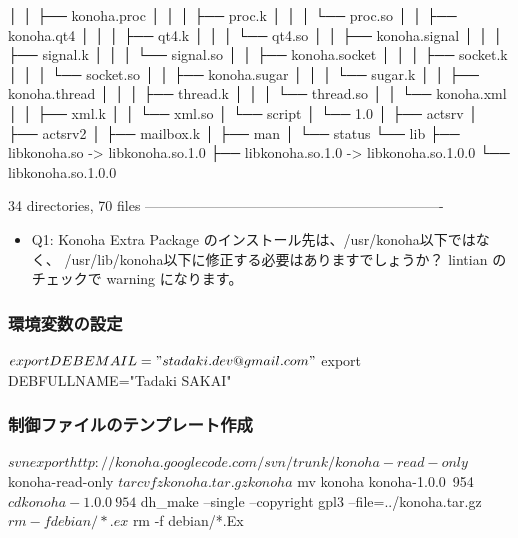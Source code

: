 \documentclass[mingoth,a4paper]{jsarticle}
\begin{document}
\begin{commandline}
    │   │       ├── konoha.proc
    │   │       │   ├── proc.k
    │   │       │   └── proc.so
    │   │       ├── konoha.qt4
    │   │       │   ├── qt4.k
    │   │       │   └── qt4.so
    │   │       ├── konoha.signal
    │   │       │   ├── signal.k
    │   │       │   └── signal.so
    │   │       ├── konoha.socket
    │   │       │   ├── socket.k
    │   │       │   └── socket.so
    │   │       ├── konoha.sugar
    │   │       │   └── sugar.k
    │   │       ├── konoha.thread
    │   │       │   ├── thread.k
    │   │       │   └── thread.so
    │   │       └── konoha.xml
    │   │           ├── xml.k
    │   │           └── xml.so
    │   └── script
    │       └── 1.0
    │           ├── actsrv
    │           ├── actsrv2
    │           ├── mailbox.k
    │           ├── man
    │           └── status
    └── lib
        ├── libkonoha.so -> libkonoha.so.1.0
        ├── libkonoha.so.1.0 -> libkonoha.so.1.0.0
        └── libkonoha.so.1.0.0

34 directories, 70 files
----------------------------------------------------------------
\end{commandline}
\fi

\begin{itemize}
\item Q1: Konoha Extra Package のインストール先は、/usr/konoha以下ではなく、
/usr/lib/konoha以下に修正する必要はありますでしょうか？
lintian のチェックで warning になります。
\end{itemize}

\subsubsection{環境変数の設定}
\begin{commandline}
$ export DEBEMAIL="stadaki.dev@gmail.com"
$ export DEBFULLNAME="Tadaki SAKAI"
\end{commandline}

\subsubsection{制御ファイルのテンプレート作成}
\begin{commandline}
$ svn export http://konoha.googlecode.com/svn/trunk/ konoha-read-only
$ konoha-read-only
$ tar cvfz konoha.tar.gz konoha
$ mv konoha konoha-1.0.0~954
$ cd konoha-1.0.0~954
$ dh_make --single --copyright gpl3 --file=../konoha.tar.gz
$ rm -f debian/*.ex
$ rm -f debian/*.Ex
\end{commandline}
\end{document}

